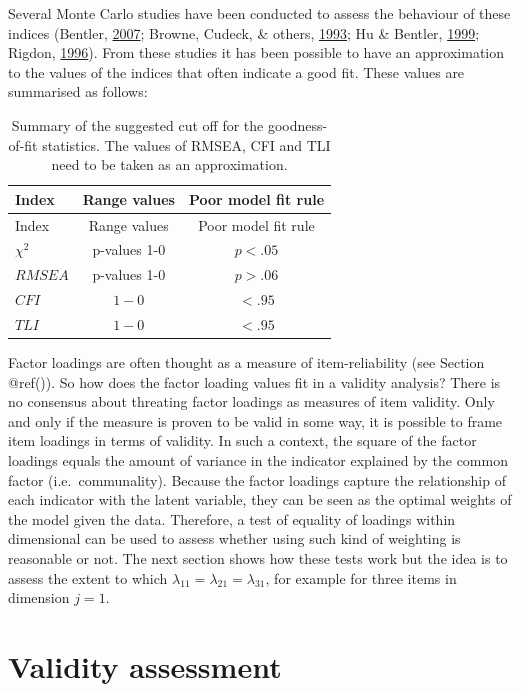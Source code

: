 \documentclass[]{book}
\begin{document}
Several Monte Carlo studies have been conducted to assess the behaviour of these indices (Bentler, \protect\hyperlink{ref-Bentler2007}{2007}; Browne, Cudeck, \& others, \protect\hyperlink{ref-Browne1993}{1993}; Hu \& Bentler, \protect\hyperlink{ref-Hu1999}{1999}; Rigdon, \protect\hyperlink{ref-Rigdon1996}{1996}). From these studies it has been possible to have an approximation to the values of the indices that often indicate a good fit. These values are summarised as follows:

\begin{longtable}[]{@{}lcc@{}}
\caption{\label{tab:cfafitstats} Summary of the suggested cut off for the goodness-of-fit statistics.
The values of RMSEA, CFI and TLI need to be taken as an approximation.}\tabularnewline
\toprule
Index & Range values & Poor model fit rule\tabularnewline
\midrule
\endfirsthead
\toprule
Index & Range values & Poor model fit rule\tabularnewline
\midrule
\endhead
\(\chi^2\) & p-values 1-0 & \(p<.05\)\tabularnewline
\(RMSEA\) & p-values 1-0 & \(p>.06\)\tabularnewline
\(CFI\) & \(1-0\) & \(<.95\)\tabularnewline
\(TLI\) & \(1-0\) & \(<.95\)\tabularnewline
\bottomrule
\end{longtable}

Factor loadings are often thought as a measure of item-reliability (see Section @ref()). So how does the factor loading values fit in a validity analysis? There is no consensus about threating factor loadings as measures of item validity. Only and only if the measure is proven to be valid in some way, it is possible to frame item loadings in terms of validity. In such a context, the square of the factor loadings equals the amount of variance in the indicator explained by the common factor (i.e.~communality). Because the factor loadings capture the relationship of each indicator with the latent variable, they can be seen as the optimal weights of the model given the data. Therefore, a test of equality of loadings within dimensional can be used to assess whether using such kind of weighting is reasonable or not. The next section shows how these tests work but the idea is to assess the extent to which \(\lambda_{11}=\lambda_{21}=\lambda_{31}\), for example for three items in dimension \(j=1\).

\hypertarget{validity-assessment}{%
\section{Validity assessment}\label{validity-assessment}}
\end{document}
